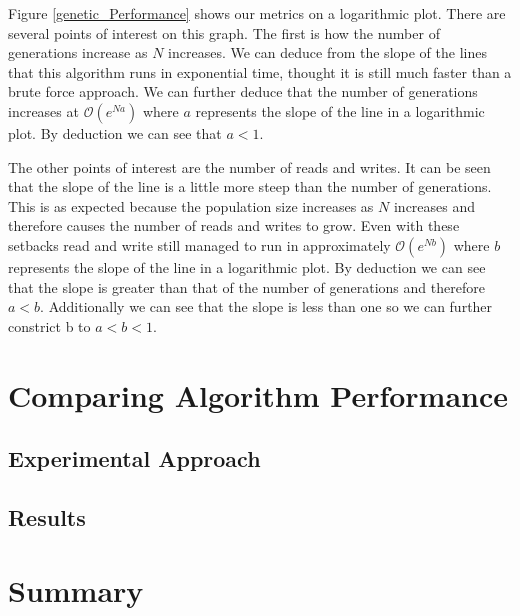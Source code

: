 \documentclass{article}
\begin{document}
	Figure \ref{genetic_Performance} shows our metrics on a logarithmic plot. There are several points of interest on this graph. The first is how the number of generations increase as $N$ increases. We can deduce from the slope of the lines that this algorithm runs in exponential time, thought it is still much faster than a brute force approach. We can further deduce that the number of generations increases at $\mathcal{O} (e^{Na})$ where $a$ represents the slope of the line in a logarithmic plot. By deduction we can see that  $a<1$.
	
	The other points of interest are the number of reads and writes. It can be seen that the slope of the line is a little more steep than the number of generations. This is as expected because the population size increases as $N$ increases and therefore causes the number of reads and writes to grow. Even with these setbacks read and write still managed to run in approximately  $\mathcal{O} (e^{Nb})$ where $b$ represents the slope of the line in a logarithmic plot. By deduction we can see that the slope is greater than that of the number of generations and therefore $a<b$. Additionally we can see that the slope is less than one so we can further constrict b to $a<b<1$. 
\section{Comparing Algorithm Performance}
	\label{comparisons}
	
	\subsection{Experimental Approach}
	
	\subsection{Results}
	
	
\section{Summary}

	




	
	
	
\end{document}
